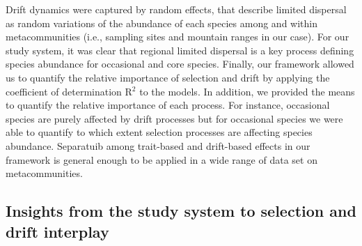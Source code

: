 \documentclass[12pt]{article}
\begin{document}
Drift dynamics were captured by random effects, that describe limited dispersal as random variations of the abundance of each species
among and within metacommunities (i.e., sampling sites and mountain
ranges in our case). For our study system, it was clear that regional
limited dispersal is a key process defining species abundance for
occasional and core species. Finally, our framework allowed us to
quantify the relative importance of selection and drift by applying
the coefficient of determination R{$^2$} \citep{Nakagawa2013,
  Nakagawa2017} to the models. In addition, we provided the means to
quantify the relative importance of each process. For instance,
occasional species are purely affected by drift processes but for
occasional species we were able to quantify to which extent selection
processes are affecting species abundance. Separatuib among
trait-based and drift-based effects in our framework is general enough
to be applied in a wide range of data set on metacommunities.


\subsection*{Insights from the study system to selection and drift interplay}
\end{document}
